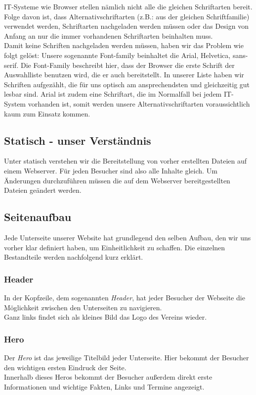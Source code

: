 \documentclass[12pt,a4paper]{article}
\begin{document}
 IT-Systeme wie Browser stellen nämlich nicht alle die gleichen Schriftarten bereit. Folge davon ist, dass Alternativschriftarten (z.B.: aus der gleichen Schriftfamilie) verwendet werden, Schriftarten nachgeladen werden müssen oder das Design von Anfang an nur die immer vorhandenen Schriftarten beinhalten muss.\\
Damit keine Schriften nachgeladen werden müssen, haben wir das Problem wie folgt gelöst: Unsere sogenannte Font-family beinhaltet die Arial, Helvetica, sans-serif.  Die Font-Family beschreibt hier, dass der Browser die erste Schrift der Auswahlliste benutzen wird, die er auch bereitstellt. In unserer Liste haben wir Schriften aufgezählt, die für uns optisch am ansprechendsten und gleichzeitig
gut lesbar sind. Arial ist zudem eine Schriftart, die im Normalfall bei jedem IT-System vorhanden ist, somit werden unsere Alternativschriftarten voraussichtlich kaum zum Einsatz kommen.

\subsection{Statisch - unser Verständnis}
Unter statisch verstehen wir die Bereitstellung von vorher erstellten Dateien auf einem Webserver. Für jeden Besucher sind also alle Inhalte gleich. Um Änderungen durchzuführen müssen die auf dem Webserver bereitgestellten Dateien geändert werden.
\subsection{Seitenaufbau}
Jede Unterseite unserer Website hat grundlegend den selben Aufbau, den wir uns vorher klar definiert haben, um Einheitlichkeit zu schaffen. Die einzelnen Bestandteile werden nachfolgend kurz erklärt.
\subsubsection{Header}
In der Kopfzeile, dem sogenannten \textit{Header}, hat jeder Besucher der Webseite die Möglichkeit zwischen den Unterseiten zu navigieren.\\
Ganz links findet sich als kleines Bild das Logo des Vereins wieder.
\subsubsection{Hero}
Der \textit{Hero} ist das jeweilige Titelbild jeder Unterseite. Hier bekommt der Besucher den wichtigen ersten Eindruck der Seite.\\
Innerhalb dieses Heros bekommt der Besucher außerdem direkt erste Informationen und wichtige Fakten, Links und Termine angezeigt.\\
\end{document}
